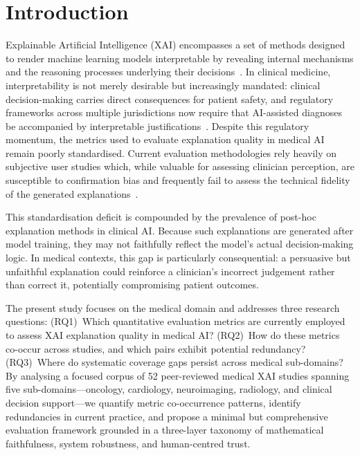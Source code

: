 \newpage
\section{Introduction}

Explainable Artificial Intelligence (XAI) encompasses a set of methods designed
to render machine learning models interpretable by revealing internal
mechanisms and the reasoning processes underlying their
decisions~\cite{Arrieta2020XAI}. In clinical medicine, interpretability is not
merely desirable but increasingly mandated: clinical decision-making carries
direct consequences for patient safety, and regulatory frameworks across
multiple jurisdictions now require that AI-assisted diagnoses be accompanied by
interpretable justifications~\cite{jin2023guidelines}. Despite this regulatory
momentum, the metrics used to evaluate explanation quality in medical AI remain
poorly standardised. Current evaluation methodologies rely heavily on
subjective user studies which, while valuable for assessing clinician
perception, are susceptible to confirmation bias and frequently fail to assess
the technical fidelity of the generated
explanations~\cite{mirzaei2023xai}.

This standardisation deficit is compounded by the prevalence of post-hoc
explanation methods in clinical AI. Because such explanations are generated
after model training, they may not faithfully reflect the model's actual
decision-making logic. In medical contexts, this gap is particularly
consequential: a persuasive but unfaithful explanation could reinforce a
clinician's incorrect judgement rather than correct it, potentially
compromising patient outcomes.

The present study focuses on the medical domain and addresses three
research questions: (RQ1)~Which quantitative evaluation metrics are
currently employed to assess XAI explanation quality in medical AI?
(RQ2)~How do these metrics co-occur across studies, and which pairs
exhibit potential redundancy? (RQ3)~Where do systematic coverage gaps
persist across medical sub-domains? By analysing a focused corpus of 52
peer-reviewed medical XAI studies spanning five sub-domains---oncology,
cardiology, neuroimaging, radiology, and clinical decision
support---we quantify metric co-occurrence patterns, identify
redundancies in current practice, and propose a minimal but comprehensive
evaluation framework grounded in a three-layer taxonomy of mathematical
faithfulness, system robustness, and human-centred trust.

